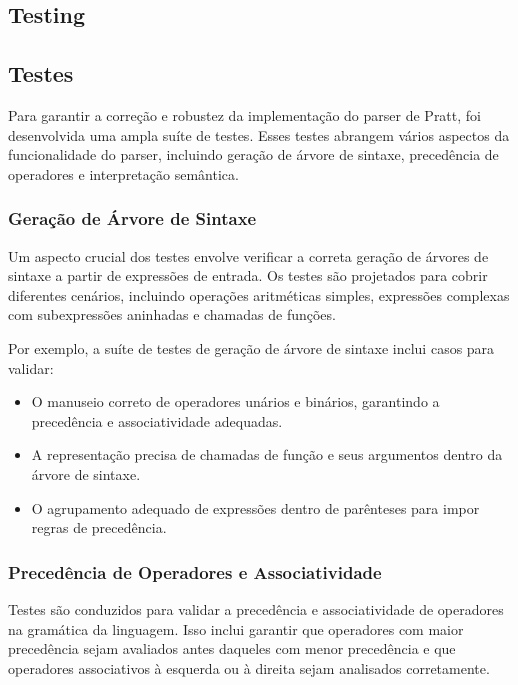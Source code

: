 \documentclass[english, 
               brazil, 
               bsc] %
               {dcomp-abntex2}
\begin{document}
\subsection{Testing}
\subsection{Testes}

Para garantir a correção e robustez da implementação do parser de Pratt, foi desenvolvida uma ampla suíte de testes. Esses testes abrangem vários aspectos da funcionalidade do parser, incluindo geração de árvore de sintaxe, precedência de operadores e interpretação semântica.

\subsubsection{Geração de Árvore de Sintaxe}

Um aspecto crucial dos testes envolve verificar a correta geração de árvores de sintaxe a partir de expressões de entrada. Os testes são projetados para cobrir diferentes cenários, incluindo operações aritméticas simples, expressões complexas com subexpressões aninhadas e chamadas de funções.

Por exemplo, a suíte de testes de geração de árvore de sintaxe inclui casos para validar:

\begin{itemize}
    \item O manuseio correto de operadores unários e binários, garantindo a precedência e associatividade adequadas.
    \item A representação precisa de chamadas de função e seus argumentos dentro da árvore de sintaxe.
    \item O agrupamento adequado de expressões dentro de parênteses para impor regras de precedência.
\end{itemize}

\subsubsection{Precedência de Operadores e Associatividade}

Testes são conduzidos para validar a precedência e associatividade de operadores na gramática da linguagem. Isso inclui garantir que operadores com maior precedência sejam avaliados antes daqueles com menor precedência e que operadores associativos à esquerda ou à direita sejam analisados corretamente.
\end{document}
